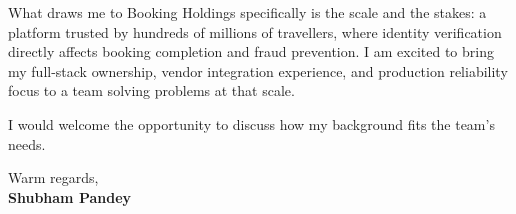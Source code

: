 \documentclass[a4paper,11pt]{article}
\begin{document}
\vspace{6pt}

What draws me to Booking Holdings specifically is the scale and the stakes: a platform trusted by hundreds of millions of travellers, where identity verification directly affects booking completion and fraud prevention. I am excited to bring my full-stack ownership, vendor integration experience, and production reliability focus to a team solving problems at that scale.

\vspace{6pt}

I would welcome the opportunity to discuss how my background fits the team's needs.

\vspace{12pt}

Warm regards, \\[4pt]
\textbf{Shubham Pandey}
\end{document}
